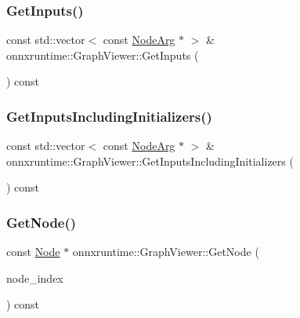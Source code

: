\subsubsection{\texorpdfstring{Get\+Inputs()}{GetInputs()}}
{\footnotesize\ttfamily const std\+::vector$<$ const \mbox{\hyperlink{classonnxruntime_1_1NodeArg}{Node\+Arg}} $\ast$ $>$ \& onnxruntime\+::\+Graph\+Viewer\+::\+Get\+Inputs (\begin{DoxyParamCaption}{ }\end{DoxyParamCaption}) const\hspace{0.3cm}{\ttfamily [noexcept]}}

\mbox{\label{classonnxruntime_1_1GraphViewer_aa1d445709d7c1348a2821a566bd8ae5d}} 
\subsubsection{\texorpdfstring{Get\+Inputs\+Including\+Initializers()}{GetInputsIncludingInitializers()}}
{\footnotesize\ttfamily const std\+::vector$<$ const \mbox{\hyperlink{classonnxruntime_1_1NodeArg}{Node\+Arg}} $\ast$ $>$ \& onnxruntime\+::\+Graph\+Viewer\+::\+Get\+Inputs\+Including\+Initializers (\begin{DoxyParamCaption}{ }\end{DoxyParamCaption}) const\hspace{0.3cm}{\ttfamily [noexcept]}}

\mbox{\label{classonnxruntime_1_1GraphViewer_a28c2a2c0c9ef24a4b62ef2de888d849b}} 
\subsubsection{\texorpdfstring{Get\+Node()}{GetNode()}}
{\footnotesize\ttfamily const \mbox{\hyperlink{classonnxruntime_1_1Node}{Node}} $\ast$ onnxruntime\+::\+Graph\+Viewer\+::\+Get\+Node (\begin{DoxyParamCaption}\item[{\mbox{\hyperlink{namespaceonnxruntime_af8773b5c12b5d8fd9292eb2e268df760}{Node\+Index}}}]{node\+\_\+index }\end{DoxyParamCaption}) const}


